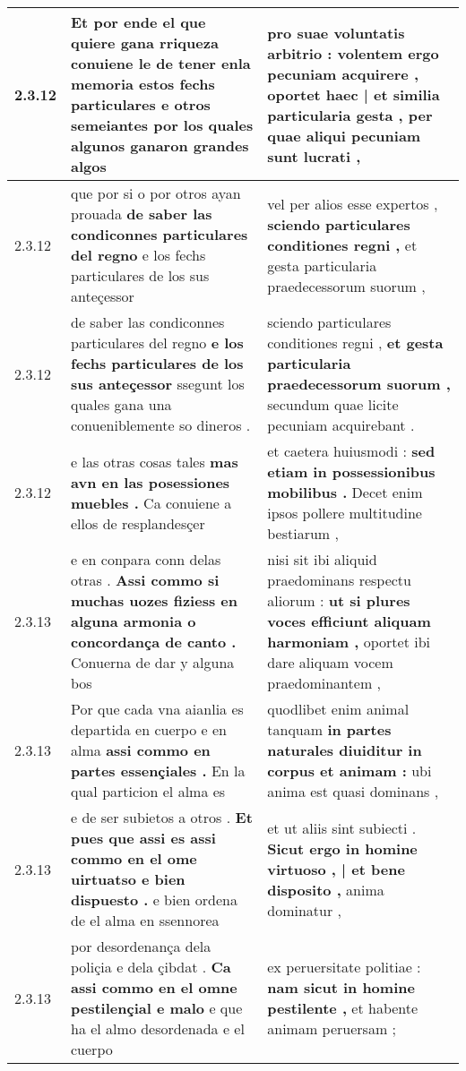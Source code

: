 \begin{tabular}{|p{1cm}|p{6.5cm}|p{6.5cm}|}
2.3.12 & Et por ende el que quiere gana rriqueza \textbf{ conuiene le de tener enla memoria estos fechs particulares e otros semeiantes } por los quales algunos ganaron grandes algos & pro suae voluntatis arbitrio : volentem ergo pecuniam acquirere , \textbf{ oportet haec | et similia particularia gesta , } per quae aliqui pecuniam sunt lucrati , \\\hline
2.3.12 & que por si o por otros ayan prouada \textbf{ de saber las condiconnes particulares del regno } e los fechs particulares de los sus anteçessor & vel per alios esse expertos , \textbf{ sciendo particulares conditiones regni , } et gesta particularia praedecessorum suorum , \\\hline
2.3.12 & de saber las condiconnes particulares del regno \textbf{ e los fechs particulares de los sus anteçessor } ssegunt los quales gana una conueniblemente so dineros . & sciendo particulares conditiones regni , \textbf{ et gesta particularia praedecessorum suorum , } secundum quae licite pecuniam acquirebant . \\\hline
2.3.12 & e las otras cosas tales \textbf{ mas avn en las posessiones muebles . } Ca conuiene a ellos de resplandesçer & et caetera huiusmodi : \textbf{ sed etiam in possessionibus mobilibus . } Decet enim ipsos pollere multitudine bestiarum , \\\hline
2.3.13 & e en conpara conn delas otras . \textbf{ Assi commo si muchas uozes fiziess en alguna armonia o concordança de canto . } Conuerna de dar y alguna bos & nisi sit ibi aliquid praedominans respectu aliorum : \textbf{ ut si plures voces efficiunt aliquam harmoniam , } oportet ibi dare aliquam vocem praedominantem , \\\hline
2.3.13 & Por que cada vna aianlia es departida en cuerpo e en alma \textbf{ assi commo en partes essençiales . } En la qual particion el alma es & quodlibet enim animal tanquam \textbf{ in partes naturales diuiditur in corpus et animam : } ubi anima est quasi dominans , \\\hline
2.3.13 & e de ser subietos a otros . \textbf{ Et pues que assi es assi commo en el ome uirtuatso e bien dispuesto . } e bien ordena de el alma en ssennorea & et ut aliis sint subiecti . \textbf{ Sicut ergo in homine virtuoso , | et bene disposito , } anima dominatur , \\\hline
2.3.13 & por desordenança dela poliçia e dela çibdat . \textbf{ Ca assi commo en el omne pestilençial e malo } e que ha el almo desordenada e el cuerpo & ex peruersitate politiae : \textbf{ nam sicut in homine pestilente , } et habente animam peruersam ; \\\hline

\end{tabular}
